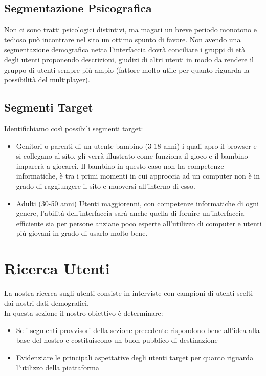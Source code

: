 \documentclass[../Report.tex]{subfiles}
\begin{document}
    \subsection{Segmentazione Psicografica}

    Non ci sono tratti psicologici distintivi, ma magari un breve periodo monotono e tedioso può incontrare nel sito un ottimo spunto di favore.
    Non avendo una segmentazione demografica netta l’interfaccia dovrà conciliare i gruppi di età degli utenti proponendo descrizioni, giudizi di altri utenti in modo da rendere il gruppo di utenti sempre più ampio (fattore molto utile per quanto riguarda la possibilità del multiplayer).

    \subsection{Segmenti Target}
    Identifichiamo così possibili segmenti target:
    \begin{itemize}
        \item Genitori o parenti di un utente bambino (3-18 anni) i quali apro il browser e si collegano al sito, gli verrà illustrato come funziona il gioco e il bambino imparerà a giocarci. Il bambino in questo caso non ha competenze informatiche, è tra i primi momenti in cui approccia ad un computer non è in grado di raggiungere il sito e muoversi all’interno di esso.
        \item Adulti (30-50 anni) Utenti maggiorenni, con competenze informatiche di ogni genere, l’abilità dell’interfaccia sará anche quella di fornire un’interfaccia efficiente sia per persone anziane poco esperte all’utilizzo di computer e utenti più giovani in grado di usarlo molto bene.      
    \end{itemize}

    \section{Ricerca Utenti}
    
    La nostra ricerca sugli utenti consiste in interviste con campioni di utenti scelti dai nostri dati demografici.\\
    In questa sezione il nostro obiettivo è determinare:
    \begin{itemize}
        \item Se i segmenti provvisori della sezione precedente rispondono bene all’idea alla base del nostro e costituiscono un buon pubblico di destinazione
        \item Evidenziare le principali aspettative degli utenti target per quanto riguarda l’utilizzo della piattaforma
    \end{itemize}
\end{document}
